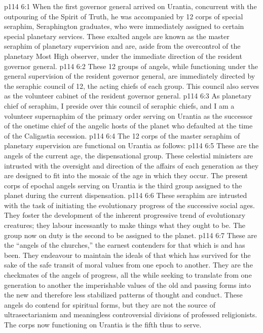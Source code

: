 \vs p114 6:1 When the first governor general arrived on Urantia, concurrent with the outpouring of the Spirit of Truth, he was accompanied by 12 corps of special seraphim, Seraphington graduates, who were immediately assigned to certain special planetary services. These exalted angels are known as the master seraphim of planetary supervision and are, aside from the overcontrol of the planetary Most High observer, under the immediate direction of the resident governor general.
\vs p114 6:2 These 12 groups of angels, while functioning under the general supervision of the resident governor general, are immediately directed by the seraphic council of 12, the acting chiefs of each group. This council also serves as the volunteer cabinet of the resident governor general.
\vs p114 6:3 As planetary chief of seraphim, I preside over this council of seraphic chiefs, and I am a volunteer supernaphim of the primary order serving on Urantia as the successor of the onetime chief of the angelic hosts of the planet who defaulted at the time of the Caligastia secession.
\vs p114 6:4 The 12 corps of the master seraphim of planetary supervision are functional on Urantia as follows:
\vs p114 6:5 \bibnobreakspace {} These are the angels of the current age, the dispensational group. These celestial ministers are intrusted with the oversight and direction of the affairs of each generation as they are designed to fit into the mosaic of the age in which they occur. The present corps of epochal angels serving on Urantia is the third group assigned to the planet during the current dispensation.
\vs p114 6:6 \bibnobreakspace {} These seraphim are intrusted with the task of initiating the evolutionary progress of the successive social ages. They foster the development of the inherent progressive trend of evolutionary creatures; they labour incessantly to make things what they ought to be. The group now on duty is the second to be assigned to the planet.
\vs p114 6:7 \bibnobreakspace {} These are the “angels of the churches,” the earnest contenders for that which is and has been. They endeavour to maintain the ideals of that which has survived for the sake of the safe transit of moral values from one epoch to another. They are the checkmates of the angels of progress, all the while seeking to translate from one generation to another the imperishable values of the old and passing forms into the new and therefore less stabilized patterns of thought and conduct. These angels do contend for spiritual forms, but they are not the source of ultrasectarianism and meaningless controversial divisions of professed religionists. The corps now functioning on Urantia is the fifth thus to serve.
